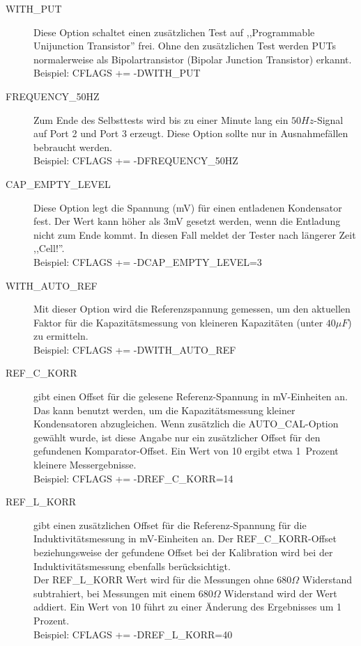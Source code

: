 \begin{description}
  \item[WITH\_PUT]
Diese Option schaltet einen zusätzlichen Test auf ,,Programmable Unijunction Transistor'' frei.
Ohne den zusätzlichen Test werden PUTs normalerweise als Bipolartransistor (Bipolar Junction Transistor) erkannt.\\
Beispiel: CFLAGS += -DWITH\_PUT

  \item[FREQUENCY\_50HZ] Zum Ende des Selbsttests wird bis zu einer Minute lang ein \(50Hz\)-Signal auf Port 2 und Port 3 erzeugt.
Diese Option sollte nur in Ausnahmefällen bebraucht werden.\\
Beispiel: CFLAGS += -DFREQUENCY\_50HZ

  \item[CAP\_EMPTY\_LEVEL] Diese Option legt die Spannung (mV) für einen entladenen Kondensator fest.
Der Wert kann höher als 3mV gesetzt werden, wenn die Entladung nicht zum Ende kommt. In diesen Fall meldet der Tester nach längerer Zeit ,,Cell!''.\\
Beispiel: CFLAGS += -DCAP\_EMPTY\_LEVEL=3

  \item[WITH\_AUTO\_REF] Mit dieser Option wird die Referenzspannung gemessen, um den aktuellen Faktor für die Kapazitätsmessung 
von kleineren Kapazitäten (unter \(40\mu F\)) zu ermitteln.\\
Beispiel: CFLAGS += -DWITH\_AUTO\_REF

  \item[REF\_C\_KORR] gibt einen Offset für die gelesene Referenz-Spannung in mV-Einheiten an.
Das kann benutzt werden, um die Kapazitätsmessung kleiner Kondensatoren abzugleichen.
Wenn zusätzlich die AUTO\_CAL-Option gewählt wurde, ist diese Angabe nur ein zusätzlicher Offset für
den gefundenen Komparator-Offset.
Ein Wert von 10 ergibt etwa 1~Prozent kleinere Messergebnisse.\\
Beispiel: CFLAGS += -DREF\_C\_KORR=14

  \item[REF\_L\_KORR] gibt einen zusätzlichen Offset für die Referenz-Spannung für die Induktivitätsmessung
in mV-Einheiten an. Der REF\_C\_KORR-Offset beziehungsweise der gefundene Offset bei der Kalibration
wird bei der Induktivitätsmessung ebenfalls berücksichtigt.\\
Der REF\_L\_KORR Wert wird für die Messungen ohne \(680\Omega\) Widerstand subtrahiert, bei Messungen mit einem
\(680\Omega\) Widerstand wird der Wert addiert.
Ein Wert von 10 führt zu einer Änderung des Ergebnisses um 1 Prozent.\\
Beispiel: CFLAGS += -DREF\_L\_KORR=40


\end{description}
